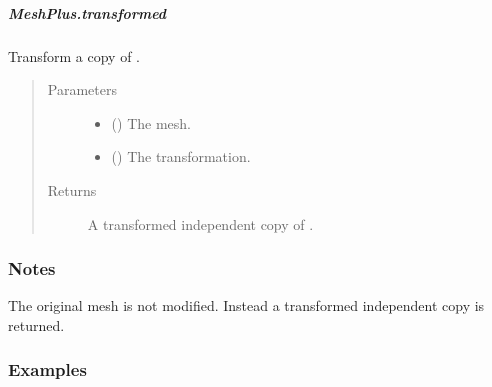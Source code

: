 \documentclass[letterpaper,10pt,english]{sphinxmanual}
\begin{document}
\begin{fulllineitems}
\subparagraph{MeshPlus.transformed}
\label{\detokenize{api/generated/directional_clustering.mesh.MeshPlus.transformed:meshplus-transformed}}\label{\detokenize{api/generated/directional_clustering.mesh.MeshPlus.transformed::doc}}

\begin{fulllineitems}
\label{\detokenize{api/generated/directional_clustering.mesh.MeshPlus.transformed:directional_clustering.mesh.MeshPlus.transformed}}
Transform a copy of .
\begin{quote}\begin{description}
\item[{Parameters}] \leavevmode\begin{itemize}
\item {} 
 () \textendash{} The mesh.

\item {} 
 () \textendash{} The transformation.

\end{itemize}

\item[{Returns}] \leavevmode
{} \textendash{} A transformed independent copy of .

\end{description}\end{quote}
\subsubsection*{Notes}

The original mesh is not modified.
Instead a transformed independent copy is returned.
\subsubsection*{Examples}


\end{fulllineitems}
\end{fulllineitems}
\end{document}
